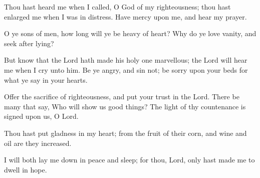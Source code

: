 Thou hast heard me when I called, O God of my righteousness; thou hast enlarged me when I was in distress. Have mercy upon me, and hear my prayer.

O ye sons of men, how long will ye be heavy of heart? Why do ye love vanity, and seek after lying?

But know that the Lord hath made his holy one marvellous; the Lord will hear me when I cry unto him.
Be ye angry, and sin not; be sorry upon your beds for what ye say in your hearts.

Offer the sacrifice of righteousness, and put your trust in the Lord. There be many that say, Who will show us good things? The light of thy countenance is signed upon us, O Lord.

Thou hast put gladness in my heart; from the fruit of their corn, and wine and oil are they increased.

I will both lay me down in peace and sleep; for thou, Lord, only hast made me to dwell in hope.
